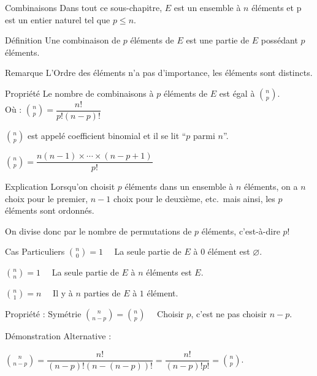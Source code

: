 \documentclass{cours}
\begin{document}
    \begin{Gpartie}{Combinaisons}
        Dans tout ce sous-chapitre, $E$ est un ensemble à $n$ éléments et p est un entier naturel tel que $p\leq n$.
        \begin{Spartie}{Définition}
            Une combinaison de $p$ éléments de $E$ est une partie de $E$ possédant $p$ éléments.
        \end{Spartie}
        \begin{Spartie}{Remarque}
            L'Ordre des éléments n'a pas d'importance, les éléments sont distincts.
        \end{Spartie}
        \begin{Spartie}{Propriété}
            Le nombre de combinaisons à $p$ éléments de $E$ est égal à $\binom{n}{p}$. \\
            Où : $\binom{n}{p}=\dfrac{n!}{p!(n-p)!}$ \par
            $\binom{n}{p}$ est appelé coefficient binomial et il se lit ``$p$ parmi $n$''. \par
            $\binom{n}{p}=\dfrac{n(n-1)\times\cdots\times(n-p+1)}{p!}$
        \end{Spartie}
        \begin{Spartie}{Explication}
            Lorsqu'on choisit $p$ éléments dans un ensemble à $n$ éléments, on a $n$ choix pour le premier, $n-1$ choix pour le deuxième, etc.\ mais ainsi, les $p$ éléments sont ordonnés. \par
            On divise donc par le nombre de permutations de $p$ éléments, c'est-à-dire $p!$
        \end{Spartie}
        \pagebreak
        \begin{Spartie}{Cas Particuliers}
            $\binom{n}{0}=1\quad$ La seule partie de $E$ à $0$ élément est $\varnothing$. \par
            $\binom{n}{n}=1\quad$ La seule partie de $E$ à $n$ éléments est $E$. \par
            $\binom{n}{1}=n\quad$ Il y à $n$ parties de $E$ à $1$ élément.
        \end{Spartie}
        \begin{Spartie}{Propriété : Symétrie}
            $\binom{n}{n-p}=\binom{n}{p}\quad$ Choisir $p$, c'est ne pas choisir $n-p$. \par
            Démonstration Alternative : \par 
            $\binom{n}{n-p}=\dfrac{n!}{(n-p)!(n-(n-p))!}=\dfrac{n!}{(n-p)!p!}=\binom{n}{p}$.
        \end{Spartie}

\end{Gpartie}
\end{document}
